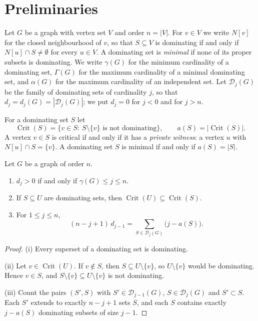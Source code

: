 \documentclass[smallextended,envcountsect,envcountsame]{svjour3}
\newcommand{\Dom}{\mathcal{D}}
\newcommand{\Crit}{\operatorname{Crit}}
\begin{document}
\section{Preliminaries}\label{sec:prelim}

Let $G$ be a graph with vertex set $V$ and order $n=|V|$. For $v\in V$ we
write $N[v]$ for the closed neighbourhood of $v$, so that $S\subseteq V$ is
dominating if and only if $N[u]\cap S\ne\emptyset$ for every $u\in V$. A
dominating set is \emph{minimal} if none of its proper subsets is dominating.
We write $\gamma(G)$ for the minimum cardinality of a dominating set,
$\Gamma(G)$ for the maximum cardinality of a minimal dominating set, and
$\alpha(G)$ for the maximum cardinality of an independent set. Let
$\Dom_j(G)$ be the family of dominating sets of cardinality $j$, so that
$d_j=d_j(G)=|\Dom_j(G)|$; we put $d_j=0$ for $j<0$ and for $j>n$.

For a dominating set $S$ let
\begingroup\small\[
  \Crit(S)=\{v\in S:\ S\setminus\{v\}\text{ is not dominating}\},\qquad
  a(S)=|\Crit(S)| .
\]\endgroup
A vertex $v\in S$ is critical if and only if it has a \emph{private witness}:
a vertex $u$ with $N[u]\cap S=\{v\}$. A dominating set $S$ is minimal if and
only if $a(S)=|S|$.

\begin{lemma}\label{lem:basic}
Let $G$ be a graph of order $n$.
\begin{enumerate}
\item[\textup{(i)}] $d_j>0$ if and only if $\gamma(G)\le j\le n$.
\item[\textup{(ii)}] If $S\subseteq U$ are dominating sets, then
$\Crit(U)\subseteq\Crit(S)$.
\item[\textup{(iii)}] For $1\le j\le n$,
\begingroup\small\begin{equation}\label{eq:incidence}
  (n-j+1)\,d_{j-1}=\sum_{S\in\Dom_j(G)}\bigl(j-a(S)\bigr).
\end{equation}\endgroup
\end{enumerate}
\end{lemma}

\begin{proof}
(i) Every superset of a dominating set is dominating.

(ii) Let $v\in\Crit(U)$. If $v\notin S$, then $S\subseteq U\setminus\{v\}$,
so $U\setminus\{v\}$ would be dominating. Hence $v\in S$, and
$S\setminus\{v\}\subseteq U\setminus\{v\}$ is not dominating.

(iii) Count the pairs $(S',S)$ with $S'\in\Dom_{j-1}(G)$, $S\in\Dom_j(G)$ and
$S'\subset S$. Each $S'$ extends to exactly $n-j+1$ sets $S$, and each $S$
contains exactly $j-a(S)$ dominating subsets of size $j-1$.
\end{proof}
\end{document}
